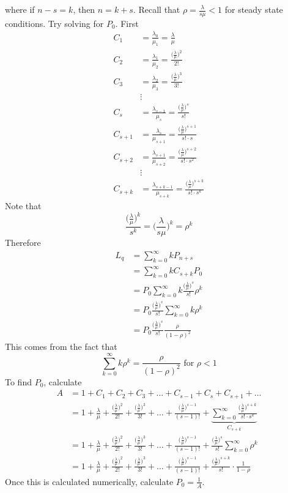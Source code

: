 \documentclass[12pt]{article}
\begin{document}
where if $n-s=k$, then $n=k+s$. Recall that $\rho = \frac{\lambda}{s\mu} < 1$ for steady state conditions. Try solving for $P_0$. First $$ \begin{aligned} C_1 &= \frac{\lambda_0}{\mu_1} = \frac{\lambda}{\mu} \\ C_2 &= \frac{\lambda_1}{\mu_2} = \frac{\Big( \frac{\lambda}{\mu}\Big)^2}{2!} \\ C_3 &= \frac{\lambda_2}{\mu_3} = \frac{\Big( \frac{\lambda}{\mu}\Big)^3}{3!} \\ &\vdots \\ C_s &= \frac{\lambda_{s-1}}{\mu_s} = \frac{\Big( \frac{\lambda}{\mu}\Big)^s}{s!} \\ C_{s+1} &= \frac{\lambda_s}{\mu_{s+1}} = \frac{\Big(\frac{\lambda}{\mu}\Big)^{s+1}}{s! \cdot s} \\ C_{s+2} &= \frac{\lambda_{s+1}}{\mu_{s+2}} = \frac{\Big( \frac{\lambda}{\mu}\Big)^{s+2}}{s! \cdot s^2} \\ &\vdots \\ C_{s+k} &= \frac{\lambda_{s+k-1}}{\mu_{s+k}} = \frac{ \Big(\frac{\lambda}{\mu}\Big)^{s+k}}{s! \cdot s^k} \end{aligned} $$ 
Note that $$ \frac{\Big(\frac{\lambda}{\mu}\Big)^k}{s^k} = \Big( \frac{\lambda}{s\mu}\Big)^k = \rho^k$$ 
Therefore $$ \begin{aligned} L_q &= \sum_{k=0}^\infty kP_{n+s} \\ &= \sum_{k=0}^\infty kC_{s+k}P_0 \\ &= P_0\sum_{k=0}^\infty k \frac{ \Big( \frac{\lambda}{\mu}\Big)^s}{s!}\rho^k \\ &= P_0\frac{\Big( \frac{\lambda}{\mu}\Big)^s}{s!} \sum_{k=0}^\infty k\rho^k \\ &= P_0\frac{\Big( \frac{\lambda}{\mu}\Big)^s}{s!} \frac{\rho}{(1-\rho)^2} \end{aligned} $$
This comes from the fact that $$\sum_{k=0}^\infty k\rho^k = \frac{\rho}{(1-\rho)^2} \text{ for } \rho < 1 $$ 
To find $P_0$, calculate $$ \begin{aligned} A &= 1 + C_1 + C_2 + C_3 + \dots + C_{s-1} + C_s + C_{s+1} + \dots \\ &= 1 + \frac{\lambda}{\mu} + \frac{ \Big( \frac{\lambda}{\mu}\Big)^2}{2!} + \frac{\Big( \frac{\lambda}{\mu}\Big)^3}{3!} + \dots + \frac{ \Big( \frac{\lambda}{\mu}\Big)^{s-1}}{(s-1)!} + \underbrace{\sum_{k=0}^\infty \frac{ \Big( \frac{\lambda}{\mu}\Big)^{s+k}}{s! \cdot s^k}}_{C_{s+k}}\\ &= 1 + \frac{\lambda}{\mu} + \frac{ \Big( \frac{\lambda}{\mu}\Big)^2}{2!} + \frac{\Big( \frac{\lambda}{\mu}\Big)^3}{3!} + \dots + \frac{ \Big( \frac{\lambda}{\mu}\Big)^{s-1}}{(s-1)!} + \frac{ \Big( \frac{\lambda}{\mu}\Big)^s}{s!} \sum_{k=0}^\infty \rho^k \\ &= 1 + \frac{\lambda}{\mu} + \frac{ \Big( \frac{\lambda}{\mu}\Big)^2}{2!} + \frac{\Big( \frac{\lambda}{\mu}\Big)^3}{3!} + \dots + \frac{ \Big( \frac{\lambda}{\mu}\Big)^{s-1}}{(s-1)!} + \frac{ \Big( \frac{\lambda}{\mu}\Big)^{s+k}}{s!} \cdot \frac{1}{1-\rho} \end{aligned} $$ Once this is calculated numerically, calculate $P_0 = \frac{1}{A}$. \\~\\
\end{document}
